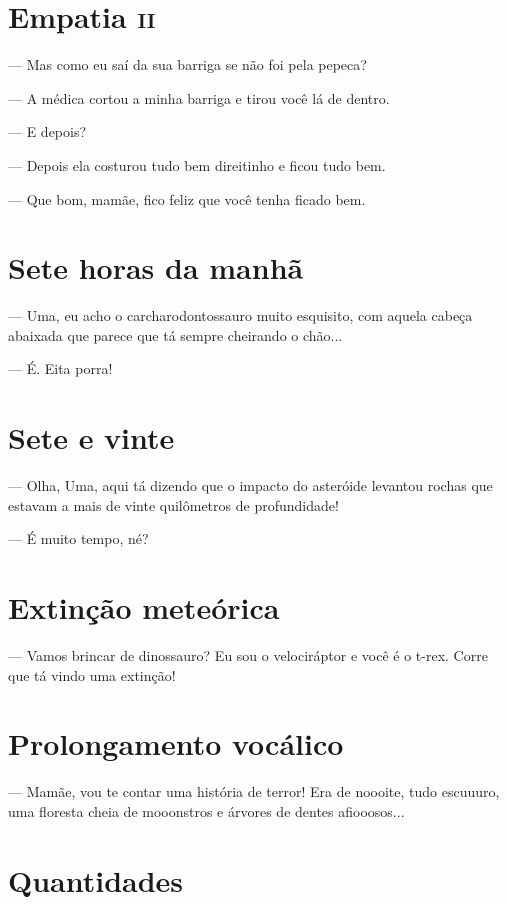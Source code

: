 \chapter{Empatia \textsc{ii}}

— Mas como eu saí da sua barriga se não foi pela pepeca?

— A médica cortou a minha barriga e tirou você lá de dentro.

— E depois?

— Depois ela costurou tudo bem direitinho e ficou tudo bem.

— Que bom, mamãe, fico feliz que você tenha ficado bem.

\chapter{Sete horas da manhã}

— Uma, eu acho o carcharodontossauro muito esquisito, com aquela cabeça
abaixada que parece que tá sempre cheirando o chão...

— É. Eita porra!

\chapter{Sete e vinte}

— Olha, Uma, aqui tá dizendo que o impacto do asteróide levantou rochas
que estavam a mais de vinte quilômetros de profundidade!

— É muito tempo, né?

\chapter{Extinção meteórica}

— Vamos brincar de dinossauro? Eu sou o velociráptor e você é o t-rex.
Corre que tá vindo uma extinção!

\chapter{Prolongamento vocálico}

— Mamãe, vou te contar uma história de terror! Era de noooite, tudo
escuuuro, uma floresta cheia de mooonstros e árvores de dentes
afiooosos...

\chapter{Quantidades}

